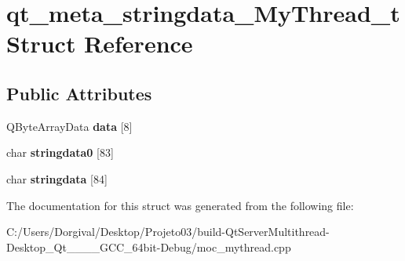 \section{qt\+\_\+meta\+\_\+stringdata\+\_\+\+My\+Thread\+\_\+t Struct Reference}
\label{structqt__meta__stringdata___my_thread__t}
\subsection*{Public Attributes}
\begin{DoxyCompactItemize}
\item 
\mbox{\label{structqt__meta__stringdata___my_thread__t_a48006bfef9a9da70245dd9282c54a780}} 
Q\+Byte\+Array\+Data {\bfseries data} [8]
\item 
\mbox{\label{structqt__meta__stringdata___my_thread__t_a849c86ec3fdb3dca8d2c11d197e097af}} 
char {\bfseries stringdata0} [83]
\item 
\mbox{\label{structqt__meta__stringdata___my_thread__t_a159ac526355c6d8df474a9b88d7600be}} 
char {\bfseries stringdata} [84]
\end{DoxyCompactItemize}


The documentation for this struct was generated from the following file\+:\begin{DoxyCompactItemize}
\item 
C\+:/\+Users/\+Dorgival/\+Desktop/\+Projeto03/build-\/\+Qt\+Server\+Multithread-\/\+Desktop\+\_\+\+Qt\+\_\+\_\+\_\+\_\+\+G\+C\+C\+\_\+64bit-\/\+Debug/moc\+\_\+mythread.\+cpp\end{DoxyCompactItemize}

